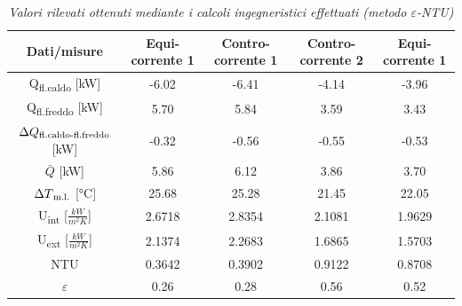 \documentclass[a4paper,10pt]{article}                                                                                       %
\begin{document}
\begin{table}[ht!]                                                                                                          %
  \centering                                                                                                                %
  \begin{tabular}{||c|c|c|c|c||}                                                                                            %
    \hline
    Dati/misure                                         & Equi-corrente 1 & Contro-corrente 1 & Contro-corrente 2 & Equi-corrente 1 \\
    \hline\hline
    Q\textsubscript{fl.caldo} [kW]                      & -6.02           & -6.41             & -4.14             & -3.96           \\
    Q\textsubscript{fl.freddo} [kW]                     & 5.70            & 5.84              & 3.59              & 3.43            \\
    $\Delta{Q\textsubscript{fl.caldo-fl.freddo}}$ [kW]  & -0.32           & -0.56             & -0.55             & -0.53           \\
    $\bar{Q}$ [kW]                                      & 5.86            & 6.12              & 3.86              & 3.70            \\
    $\Delta{T\textsubscript{m.l.}}$ [°C]                & 25.68           & 25.28             & 21.45             & 22.05           \\
    U\textsubscript{int} [$\frac{kW}{m^{2}K}$]          & 2.6718          & 2.8354            & 2.1081            & 1.9629          \\
    U\textsubscript{ext} [$\frac{kW}{m^{2}K}$]          & 2.1374          & 2.2683            & 1.6865            & 1.5703          \\
    NTU                                                 & 0.3642          & 0.3902            & 0.9122            & 0.8708          \\
    $\varepsilon$                                       & 0.26            & 0.28              & 0.56              & 0.52            \\
    \hline
  \end{tabular}                                                                                                             %
  \caption{\textit{Valori rilevati ottenuti mediante i calcoli ingegneristici effettuati (metodo $\varepsilon$-NTU)}}       %
  \label{tab:eps_ntu_calcs}                                                                                                 %
\end{table}                                                                                                                 %
\end{document}
